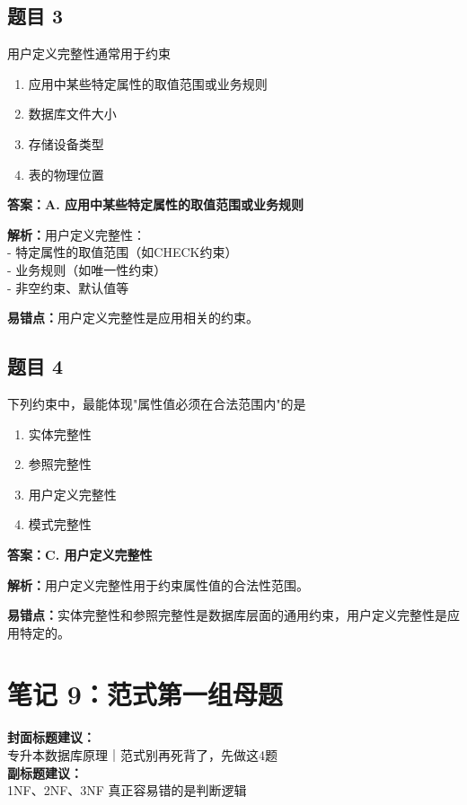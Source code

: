 \documentclass[12pt,a4paper]{ctexart}
\begin{document}
\subsection*{题目 3}
用户定义完整性通常用于约束
\begin{enumerate}[label=\Alph*.]
	\item 应用中某些特定属性的取值范围或业务规则
	\item 数据库文件大小
	\item 存储设备类型
	\item 表的物理位置
\end{enumerate}

\begin{answerbox}
	\textbf{答案：A. 应用中某些特定属性的取值范围或业务规则}

	\textbf{解析：}用户定义完整性：\\
	- 特定属性的取值范围（如CHECK约束）\\
	- 业务规则（如唯一性约束）\\
	- 非空约束、默认值等

	\textbf{易错点：}用户定义完整性是应用相关的约束。
\end{answerbox}

\subsection*{题目 4}
下列约束中，最能体现"属性值必须在合法范围内"的是
\begin{enumerate}[label=\Alph*.]
	\item 实体完整性
	\item 参照完整性
	\item 用户定义完整性
	\item 模式完整性
\end{enumerate}

\begin{answerbox}
	\textbf{答案：C. 用户定义完整性}

	\textbf{解析：}用户定义完整性用于约束属性值的合法性范围。

	\textbf{易错点：}实体完整性和参照完整性是数据库层面的通用约束，用户定义完整性是应用特定的。
\end{answerbox}

\newpage

\section{笔记 9：范式第一组母题}
\begin{coverbox}
	\textbf{封面标题建议：}\\
	专升本数据库原理｜范式别再死背了，先做这4题\\
	\textbf{副标题建议：}\\
	1NF、2NF、3NF 真正容易错的是判断逻辑
\end{coverbox}
\end{document}

